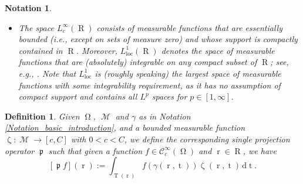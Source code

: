 \documentclass[12pt]{article}
\newtheorem{definition}[theorem]{Definition}
\newtheorem{notation}[theorem]{Notation}
\DeclareMathOperator{\RR}{{\mathbb{R}}}
\DeclareMathOperator{\Projind}{\mathfrak{p}}
\newcommand{\dd}[1]{\,\mathrm{d}{#1}}
\DeclareMathOperator{\tvariable}{t}
\DeclareMathOperator{\tgroundset}{T}
\DeclareMathOperator{\rayvariable}{r}
\DeclareMathOperator{\raygroundset}{R}
\DeclareMathOperator{\weightfkt}{\zeta}
\DeclareMathOperator{\imgdom}{{\Omega}}
\DeclareMathOperator{\gammagroundset}{{\mathcal M}}
\begin{document}
\begin{notation}
\begin{itemize}
\item[2.b)] 
The space $L^\infty_c(\raygroundset)$ consists of measurable functions that are essentially bounded (i.e., except on sets of measure zero) and whose support is compactly contained in $\raygroundset$.
Moreover,  $L^1_\text{loc}(\raygroundset)$ denotes the space of measurable functions that are (absolutely) integrable on any compact subset of $\raygroundset$; see, e.g., \cite{evans2010partial}. Note that $L^1_\text{loc}$ is (roughly speaking) the largest space of measurable functions with some integrability requirement, as it has no assumption of compact support and contains all $L^p$ spaces for $p\in [1,\infty]$. 











\end{itemize}




\end{notation}

\begin{definition}
\label{def_projection_curves}
Given $\imgdom$, $\gammagroundset$ and $\gamma$ as in Notation \ref{Notation_basic_introduction}, and a bounded measurable function $\weightfkt\colon \gammagroundset \to [c,C]$ with $0<c<C$, we define  the corresponding single projection operator $\Projind$ such that given a function $f\in \mathcal{C}^\infty_c(\imgdom)$ and $\rayvariable \in \raygroundset$, we have
\begin{equation}\label{equ_def_single_proj_operator}
[\Projind f](\rayvariable) := \int_{\tgroundset (\rayvariable)} f(\gamma(\rayvariable,\tvariable)) \weightfkt(\rayvariable,\tvariable) \dd \tvariable.
\end{equation}

\end{definition}
\end{document}
